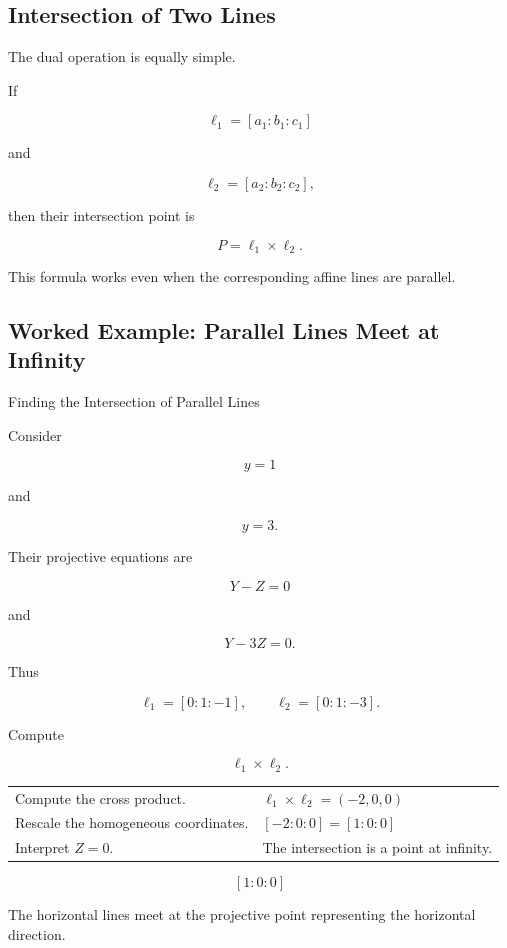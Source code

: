 \subsection{Intersection of Two Lines}
\label{subsec:intersection-projective-lines}

The dual operation is equally simple.

If

\[
\ell_1=[a_1:b_1:c_1]
\]

and

\[
\ell_2=[a_2:b_2:c_2],
\]

then their intersection point is

\[
\boxed{
P=\ell_1\times\ell_2.
}
\]

This formula works even when the corresponding affine lines are parallel.

\subsection{Worked Example: Parallel Lines Meet at Infinity}
\label{subsec:worked-parallel-lines-infinity}

\begin{workedexamplebox}{Finding the Intersection of Parallel Lines}

Consider

\[
y=1
\]

and

\[
y=3.
\]

Their projective equations are

\[
Y-Z=0
\]

and

\[
Y-3Z=0.
\]

Thus

\[
\ell_1=[0:1:-1],
\qquad
\ell_2=[0:1:-3].
\]

Compute

\[
\ell_1\times\ell_2.
\]

\begin{tabularx}{\textwidth}{@{}>{\raggedright\arraybackslash}p{}X@{}}
Compute the cross product. &
\(\ell_1\times\ell_2=(-2,0,0)\)\\
Rescale the homogeneous coordinates. &
\([-2:0:0]=[1:0:0]\)\\
Interpret \(Z=0\). &
The intersection is a point at infinity.
\end{tabularx}

\begin{answerbox}
\[
\boxed{[1:0:0]}
\]

The horizontal lines meet at the projective point representing the
horizontal direction.
\end{answerbox}
\end{workedexamplebox}

